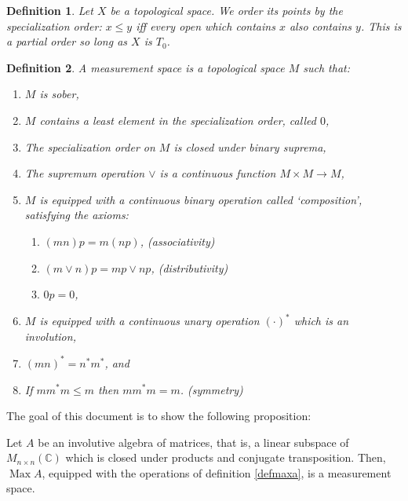 \documentclass{article}
\theoremstyle{plain}
\newtheorem{definition}{Definition}
\theoremstyle{nonumberplain}
\DeclareMathOperator{\Max}{Max}
\newcommand{\C}{\mathbb{C}}
\begin{document}
\begin{definition}
Let $X$ be a topological space. We order its points by the specialization order: $x \leq y$ iff every open which contains $x$ also contains $y$. This is a partial order so long as $X$ is $T_0$.
\end{definition}

\begin{definition}\label{def:ms}
A measurement space is a topological space $M$ such that:
\begin{enumerate}[label=\roman*)]
\item \label{msober} $M$ is sober,
\item \label{leastelem} $M$ contains a least element in the specialization order, called $0$,
\item \label{binsup} The specialization order on $M$ is closed under binary suprema,
\item \label{contsup} The supremum operation $\lor$ is a continuous function $M \times M \to M$,
\item \label{binop} $M$ is equipped with a continuous binary operation called `composition', satisfying the axioms:
\begin{enumerate}
\item \label{assoc} $(mn)p = m(np)$, \quad \textit{(associativity)}
\item \label{dist} $(m \lor n)p = mp \lor np$, \quad \textit{(distributivity)}
\item \label{absorp} $0p = 0$,
\end{enumerate}
\item \label{inv1} $M$ is equipped with a continuous unary operation $(\cdot)^*$ which is an involution,
\item \label{inv2} $(mn)^* = n^* m^*$, and
\item \label{symmetry} If $m m^* m \leq m$ then $m m^* m = m$. \quad \textit{(symmetry)}
\end{enumerate}
\end{definition}

The goal of this document is to show the following proposition:

\begin{prop*}
Let $A$ be an involutive algebra of matrices, that is, a linear subspace of $M_{n \times n}(\C)$ which is closed under products and conjugate transposition. Then, $\Max A$, equipped with the operations of definition \ref{defmaxa}, is a measurement space.
\end{prop*}
\end{document}
